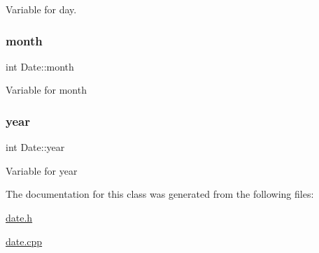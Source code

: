 Variable for day. \mbox{\label{class_date_a533843e07c6ac8d19fee9b16f5336ba2}} 
\subsubsection{\texorpdfstring{month}{month}}
{\footnotesize\ttfamily int Date\+::month\hspace{0.3cm}{\ttfamily [private]}}

Variable for month \mbox{\label{class_date_a3eeced2ed56bc95d56782b9e738db8ea}} 
\subsubsection{\texorpdfstring{year}{year}}
{\footnotesize\ttfamily int Date\+::year\hspace{0.3cm}{\ttfamily [private]}}

Variable for year 

The documentation for this class was generated from the following files\+:\begin{DoxyCompactItemize}
\item 
\hyperlink{date_8h}{date.\+h}\item 
\hyperlink{date_8cpp}{date.\+cpp}\end{DoxyCompactItemize}
